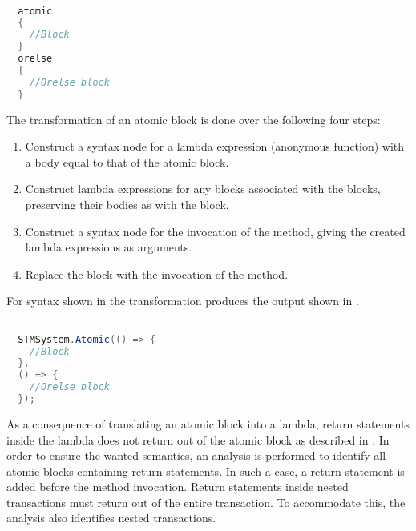\begin{lstlisting}[label=lst:before_atomic_block,
  caption={\bscode{atomic} Block Before Transformation},
  language=Java,  
  showspaces=false,
  showtabs=false,
  breaklines=true,
  showstringspaces=false,
  breakatwhitespace=true,
  commentstyle=\color{greencomments},
  keywordstyle=\color{bluekeywords},
  stringstyle=\color{redstrings},
  morekeywords={atomic, retry, orelse, var, get, set}]  % Start your code-block

  atomic
  {
    //Block
  }
  orelse
  {
    //Orelse block
  }
\end{lstlisting}
The transformation of an atomic block is done over the following four steps:
\begin{enumerate}
	\item Construct a syntax node for a lambda expression (anonymous function) with a body equal to that of the atomic block.
	\item Construct lambda expressions for any  blocks associated with the  blocks, preserving their bodies as with the  block.
	\item Construct a syntax node for the invocation of the  method, giving the created lambda expressions as arguments.
	\item Replace the  block with the invocation of the  method.
\end{enumerate}
For syntax shown in  the transformation produces the output shown in .

\begin{lstlisting}[label=lst:after_atomic_block,
  caption={\bscode{atomic} Block After Transformation},
  language=Java,  
  showspaces=false,
  showtabs=false,
  breaklines=true,
  showstringspaces=false,
  breakatwhitespace=true,
  commentstyle=\color{greencomments},
  keywordstyle=\color{bluekeywords},
  stringstyle=\color{redstrings},
  morekeywords={atomic, retry, orelse, var, get, set}]  % Start your code-block

  STMSystem.Atomic(() => {
    //Block					
  },
  () => {
    //Orelse block
  });
\end{lstlisting}
As a consequence of translating an atomic block into a lambda, return statements inside the lambda does not return out of the atomic block as described in . In order to ensure the wanted semantics, an analysis is performed to identify all atomic blocks containing return statements. In such a case, a return statement is added before the method invocation. Return statements inside nested transactions must return out of the entire transaction. To accommodate this, the analysis also identifies nested transactions.

